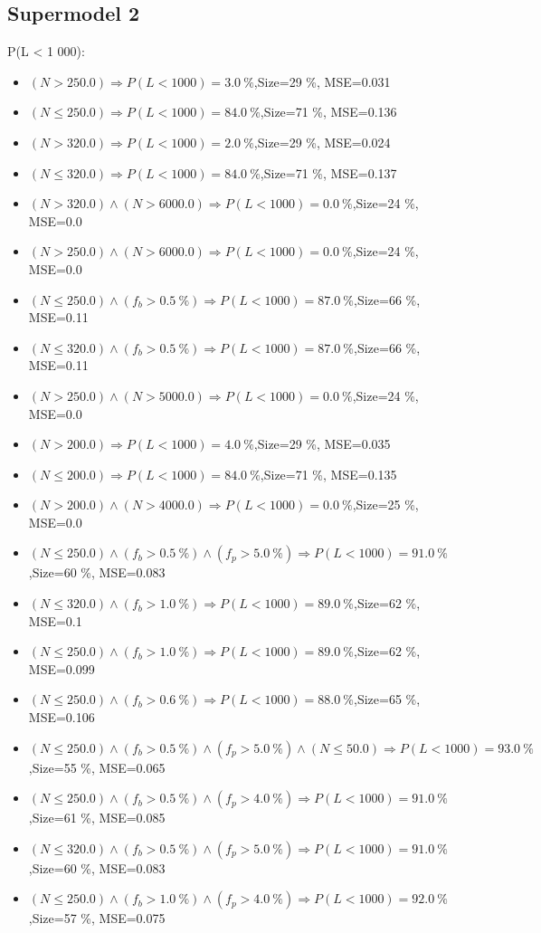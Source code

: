 \documentclass[numbered]{CSL}
\begin{document}
\subsection{Supermodel 2}
P(L < 1 000):
\begin{itemize}
\item $(N > 250.0) \Rightarrow P(L < 1 000) = 3.0~\%$,\hfill Size=29 \%, MSE=0.031
\item $(N \leq 250.0) \Rightarrow P(L < 1 000) = 84.0~\%$,\hfill Size=71 \%, MSE=0.136
\item $(N > 320.0) \Rightarrow P(L < 1 000) = 2.0~\%$,\hfill Size=29 \%, MSE=0.024
\item $(N \leq 320.0) \Rightarrow P(L < 1 000) = 84.0~\%$,\hfill Size=71 \%, MSE=0.137
\item $(N > 320.0) \land (N > 6000.0) \Rightarrow P(L < 1 000) = 0.0~\%$,\hfill Size=24 \%, MSE=0.0
\item $(N > 250.0) \land (N > 6000.0) \Rightarrow P(L < 1 000) = 0.0~\%$,\hfill Size=24 \%, MSE=0.0
\item $(N \leq 250.0) \land (f_b > 0.5~\%) \Rightarrow P(L < 1 000) = 87.0~\%$,\hfill Size=66 \%, MSE=0.11
\item $(N \leq 320.0) \land (f_b > 0.5~\%) \Rightarrow P(L < 1 000) = 87.0~\%$,\hfill Size=66 \%, MSE=0.11
\item $(N > 250.0) \land (N > 5000.0) \Rightarrow P(L < 1 000) = 0.0~\%$,\hfill Size=24 \%, MSE=0.0
\item $(N > 200.0) \Rightarrow P(L < 1 000) = 4.0~\%$,\hfill Size=29 \%, MSE=0.035
\item $(N \leq 200.0) \Rightarrow P(L < 1 000) = 84.0~\%$,\hfill Size=71 \%, MSE=0.135
\item $(N > 200.0) \land (N > 4000.0) \Rightarrow P(L < 1 000) = 0.0~\%$,\hfill Size=25 \%, MSE=0.0
\item $(N \leq 250.0) \land (f_b > 0.5~\%) \land (f_p > 5.0~\%) \Rightarrow P(L < 1 000) = 91.0~\%$,\hfill Size=60 \%, MSE=0.083
\item $(N \leq 320.0) \land (f_b > 1.0~\%) \Rightarrow P(L < 1 000) = 89.0~\%$,\hfill Size=62 \%, MSE=0.1
\item $(N \leq 250.0) \land (f_b > 1.0~\%) \Rightarrow P(L < 1 000) = 89.0~\%$,\hfill Size=62 \%, MSE=0.099
\item $(N \leq 250.0) \land (f_b > 0.6~\%) \Rightarrow P(L < 1 000) = 88.0~\%$,\hfill Size=65 \%, MSE=0.106
\item $(N \leq 250.0) \land (f_b > 0.5~\%) \land (f_p > 5.0~\%) \land (N \leq 50.0) \Rightarrow P(L < 1 000) = 93.0~\%$,\hfill Size=55 \%, MSE=0.065
\item $(N \leq 250.0) \land (f_b > 0.5~\%) \land (f_p > 4.0~\%) \Rightarrow P(L < 1 000) = 91.0~\%$,\hfill Size=61 \%, MSE=0.085
\item $(N \leq 320.0) \land (f_b > 0.5~\%) \land (f_p > 5.0~\%) \Rightarrow P(L < 1 000) = 91.0~\%$,\hfill Size=60 \%, MSE=0.083
\item $(N \leq 250.0) \land (f_b > 1.0~\%) \land (f_p > 4.0~\%) \Rightarrow P(L < 1 000) = 92.0~\%$,\hfill Size=57 \%, MSE=0.075
\end{itemize}
\end{document}
